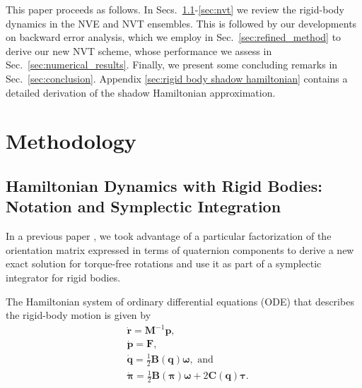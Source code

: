 \documentclass[
	aip,
	jcp,
	reprint,
]{revtex4-1}
\newcommand{\mt}[1]{\boldsymbol{\mathbf{#1}}}          %
\newcommand{\vt}[1]{\boldsymbol{\mathbf{#1}}}          %
\newcommand{\diff}[2]{\frac{\partial #1}{\partial #2}} %
\newcommand{\Ham}[1]{{\mathcal H}_\text{#1}}           %
\begin{document}
This paper proceeds as follows.
In Secs.~\ref{sec:nve}-\ref{sec:nvt} we review the rigid-body dynamics in the NVE and NVT ensembles.
This is followed by our developments on backward error analysis, which we employ in Sec.~\ref{sec:refined_method} to derive our new NVT scheme, whose performance we assess in Sec.~\ref{sec:numerical_results}.
Finally, we present some concluding remarks in Sec.~\ref{sec:conclusion}. Appendix \ref{sec:rigid body shadow hamiltonian} contains a detailed derivation of the shadow Hamiltonian approximation.

\section{Methodology}
\label{sec:methodology}

\subsection{Hamiltonian Dynamics with Rigid Bodies: Notation and Symplectic Integration}
\label{sec:nve}

In a previous paper \cite{Silveira_2017}, we took advantage of a particular factorization of the orientation matrix expressed in terms of quaternion components to derive a new exact solution for torque-free rotations and use it as part of a symplectic integrator for rigid bodies.

The Hamiltonian system of ordinary differential equations (ODE) that describes the rigid-body motion is given by \cite{Silveira_2017}
\begin{subequations}
	\label{eq:ODE system for NVE}
	\begin{align}
%
	&\dot{\vt r} =
	{\mt M}^{-1} {\vt p}, \\
%
	&\dot{\vt p} =
	{\vt F}, \\
%
	&\dot{\vt q} =
	\frac{1}{2} \mt B(\vt q) \vt \omega, \text{ and} \label{eq:EDO_q} \\
%
	&\dot{\vt \pi} =
	\frac{1}{2} \mt B(\vt \pi) \vt \omega + 2 \mt C(\vt q) \vt \tau. \label{eq:EDO_pi}
	\end{align}
\end{subequations}
\end{document}
